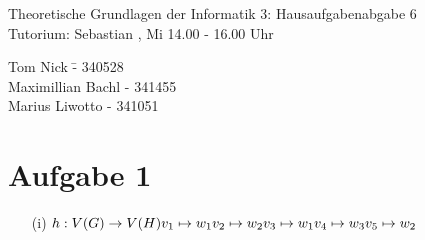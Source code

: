 \documentclass[a4paper,10pt]{article}
\begin{document}
\begin{center}
\Large{Theoretische Grundlagen der Informatik 3: Hausaufgabenabgabe 6} \\
\large{Tutorium: Sebastian , Mi 14.00 - 16.00 Uhr}
\end{center}
\begin{tabbing}
Tom Nick \hspace{2cm}\= - 340528\\
Maximillian Bachl \> - 341455 \\
Marius Liwotto\> -  341051
\end{tabbing}
\section*{Aufgabe 1}
\begin{enumerate}
	\item[(i)]
	\( h: V(G) \rightarrow V(H)\\
	v_1 \mapsto w_1 \\
	v_2 \mapsto w_2 \\
	v_3 \mapsto w_1 \\
	v_4 \mapsto w_3 \\
	v_5 \mapsto w_2 \)


\end{enumerate}
\end{document}
